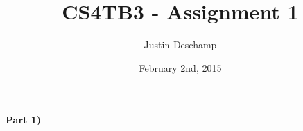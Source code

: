 \documentclass[12pt]{article}
\title{CS4TB3 - Assignment 1}
\author{Justin Deschamp}
\date{February 2nd, 2015}
\begin{document}
\maketitle

\textbf{Part 1)}
\end{document}
